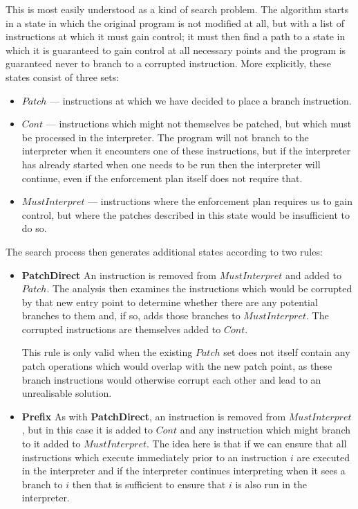 This is most easily understood as a kind of search
problem.  The algorithm starts in a
state in which the original program is not modified at all, but with a
list of instructions at which it must gain control; it must then find
a path to a state in which it is guaranteed to gain control at all
necessary points and the program is guaranteed never to branch to a
corrupted instruction.  More explicitly, these states consist of three
sets:

\begin{itemize}
\item $\mathit{Patch}$ --- instructions at which we have decided to place a
  branch instruction.
\item $\mathit{Cont}$ --- instructions which might not themselves be
  patched, but which must be processed in the interpreter.  The
  program will not branch to the interpreter when it encounters one of
  these instructions, but if the interpreter has already started when
  one needs to be run then the interpreter will continue, even if the
  enforcement plan itself does not require that.
\item $\mathit{MustInterpret}$ --- instructions where the enforcement
  plan requires us to gain control, but where the patches described in
  this state would be insufficient to do so.
\end{itemize}

The search process then generates additional states according to two
rules:

\begin{itemize}
\item
  \textbf{PatchDirect} An instruction is removed from
  $\mathit{MustInterpret}$ and added to $\mathit{Patch}$.  The
  analysis then examines the instructions which would be corrupted by
  that new entry point to determine whether there are any potential
  branches to them and, if so, adds those branches to
  $\mathit{MustInterpret}$.  The corrupted instructions are themselves
  added to $\mathit{Cont}$.

  This rule is only valid when the existing $\mathit{Patch}$ set does
  not itself contain any patch operations which would overlap with the
  new patch point, as these branch instructions would otherwise
  corrupt each other and lead to an unrealisable solution.
\item
  \textbf{Prefix} As with \textbf{PatchDirect}, an instruction is
  removed from $\mathit{MustInterpret}$, but in this case it is added
  to $\mathit{Cont}$ and any instruction which might branch to it
  added to $\mathit{MustInterpret}$.  The idea here is that if we can
  ensure that all instructions which execute immediately prior to an
  instruction $i$ are executed in the interpreter and if the
  interpreter continues interpreting when it sees a branch to $i$ then
  that is sufficient to ensure that $i$ is also run in the
  interpreter.
\end{itemize}

